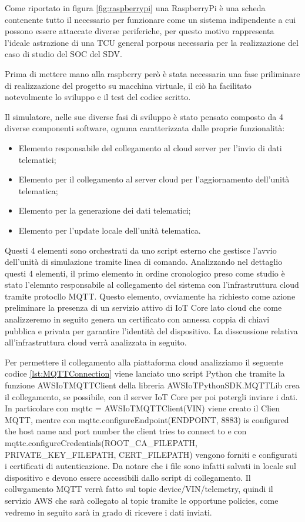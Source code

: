 Come riportato in figura \ref{fig:raspberrypi} una RaspberryPi è una scheda contenente tutto il necessario per funzionare come un sistema indipendente a cui possono essere attaccate diverse periferiche, per questo motivo rappresenta l'ideale astrazione di una TCU general porpous necessaria per la realizzazione del caso di studio del SOC del SDV.

Prima di mettere mano alla raspberry però è stata necessaria una fase priliminare di realizzazione del progetto su macchina virtuale, il ciò ha facilitato notevolmente lo sviluppo e il test del codice scritto.

Il simulatore, nelle sue diverse fasi di sviluppo è stato pensato composto da 4 diverse componenti software, ognuna caratterizzata dalle proprie funzionalità:
\begin{itemize}
    \item Elemento responsabile del collegamento al cloud server per l'invio di dati telematici;
    \item Elemento per il collegamento al server cloud per l'aggiornamento dell'unità telematica;
    \item Elemento per la generazione dei dati telematici;
    \item Elemento per l'update locale dell'unità telematica.
\end{itemize}

Questi 4 elementi sono orchestrati da uno script esterno che gestisce l'avvio dell'unità di simulazione tramite linea di comando. 
Analizzando nel dettaglio questi 4 elementi, il primo elemento in ordine cronologico preso come studio è stato l'elemnto responsabile al collegamento del sistema con l'infrastruttura cloud tramite protocllo MQTT. Questo elemento, ovviamente ha richiesto come azione preliminare la presenza di un servizio attivo di IoT Core lato cloud che come analizzeremo in seguito genera un certificato con annessa coppia di chiavi pubblica e privata per garantire l'identità del dispositivo. La disscussione relativa all'infrastruttura cloud verrà analizzata in seguito. 

Per permettere il collegamento alla piattaforma cloud analizziamo il seguente codice \ref{lst:MQTTConnection} viene lanciato uno script Python che tramite la funzione AWSIoTMQTTClient della libreria AWSIoTPythonSDK.MQTTLib crea il collegamento, se possibile, con il server IoT Core per poi potergli inviare i dati. In particolare con mqttc = AWSIoTMQTTClient(VIN) viene creato il Clien MQTT, mentre con mqttc.configureEndpoint(ENDPOINT, 8883) is configured the host name and port number the client tries to connect to e con mqttc.configureCredentials(ROOT_CA_FILEPATH, PRIVATE_KEY_FILEPATH, CERT_FILEPATH) vengono forniti e configurati i certificati di autenticazione. Da notare che i file sono infatti salvati in locale sul dispositivo e devono essere accessibili dallo script di collegamento. Il collwgamento MQTT verrà fatto sul topic device/{VIN}/telemetry, quindi il servizio AWS che sarà collegato al topic tramite le opportune policies, come vedremo in seguito sarà in grado di ricevere i dati inviati.

